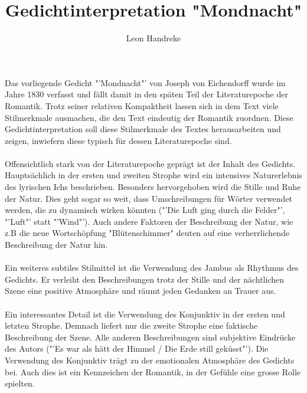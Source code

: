 \documentclass[11pt]{article}
\title{Gedichtinterpretation "Mondnacht"}
\author{Leon Handreke}
\date{}                                           %
\begin{document}
\maketitle

\selectfont



\paragraph{}
Das vorliegende Gedicht "'Mondnacht"' von Joseph von Eichendorff wurde im Jahre 1830 verfasst und fällt damit in den späten Teil der Literaturepoche der Romantik. Trotz seiner relativen Kompaktheit lassen sich in dem Text viele Stilmerkmale ausmachen, die den Text eindeutig der Romantik zuordnen. Diese Gedichtinterpretation soll diese Stilmerkmale des Textes herausarbeiten und zeigen, inwiefern diese typisch für dessen Literaturepoche sind.
\paragraph{}
Offensichtlich stark von der Literaturepoche geprägt ist der Inhalt des Gedichts. Hauptsächlich in der ersten und zweiten Strophe wird ein intensives Naturerlebnis des lyrischen Ichs beschrieben. Besonders hervorgehoben wird die Stille und Ruhe der Natur. Dies geht sogar so weit, dass Umschreibungen für Wörter verwendet werden, die zu dynamisch wirken könnten ("'Die Luft ging durch die Felder"', "'Luft"' statt "'Wind"'). Auch andere Faktoren der Beschreibung der Natur, wie z.B die neue Wortschöpfung "Blütenschimmer" deuten auf eine verherrlichende Beschreibung der Natur hin.
\paragraph{}
Ein weiteres subtiles Stilmittel ist die Verwendung des Jambus als Rhythmus des Gedichts. Er verleiht den Beschreibungen trotz der Stille und der nächtlichen Szene eine positive Atmosphäre und räumt jeden Gedanken an Trauer aus.
\paragraph{}
Ein interessantes Detail ist die Verwendung des Konjunktiv in der ersten und letzten Strophe. Demnach liefert nur die zweite Strophe eine faktische Beschreibung der Szene. Alle anderen Beschreibungen sind subjektive Eindrücke des Autors ("'Es war als hätt der Himmel / Die Erde still geküsst"'). Die Verwendung des Konjunktiv trägt zu der emotionalen Atmosphäre des Gedichts bei. Auch dies ist ein Kennzeichen der Romantik, in der Gefühle eine grosse Rolle spielten.
\end{document}
